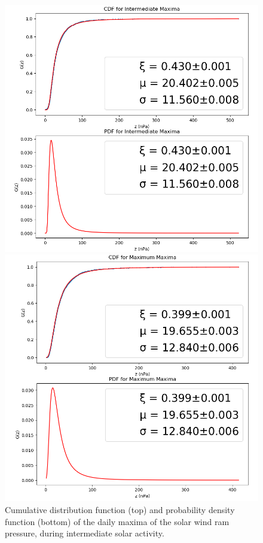 \documentclass[12pt]{article}
\begin{document}
        \begin{figure}[t!]
            \begin{minipage}{0.48\textwidth}
                \centering
                \includegraphics[width=\textwidth]{fig_method/Pintmax.png}
                \caption{Cumulative distribution function (top) and probability density function (bottom) of the daily maxima of the solar wind ram pressure, during intermediate solar activity.}
                \label{fig:Pintmax}
            \end{minipage}
            \hfill
            \begin{minipage}{0.48\textwidth}
                \centering
                \includegraphics[width=\textwidth]{fig_method/Pmaxmax.png}

\end{minipage}
\end{figure}
\end{document}

